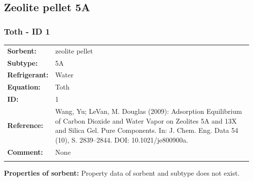 \subsection{Zeolite pellet 5A}
%
\subsubsection{Toth - ID 1}
%
\begin{tabular}[l]{|lp{11.5cm}|}
\hline
\addlinespace

\textbf{Sorbent:} & zeolite pellet \\
\textbf{Subtype:} & 5A \\
\textbf{Refrigerant:} & Water \\
\textbf{Equation:} & Toth \\
\textbf{ID:} & 1 \\
\textbf{Reference:} & Wang, Yu; LeVan, M. Douglas (2009): Adsorption Equilibrium of Carbon Dioxide and Water Vapor on Zeolites 5A and 13X and Silica Gel. Pure Components. In: J. Chem. Eng. Data 54 (10), S. 2839–2844. DOI: 10.1021/je800900a. \\
\textbf{Comment:} & None \\

\addlinespace
\hline
\end{tabular}
\newline

\textbf{Properties of sorbent:}
\newline
%
Property data of sorbent and subtype does not exist.

